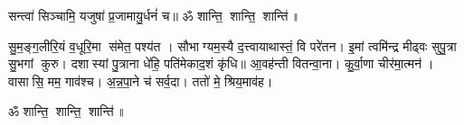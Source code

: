 
सन्त्वा॑ सिञ्चामि॒ यजुषा॑ प्र॒जामायु॒र्धनं॑ च॥ ॐ शान्ति॒ शान्ति॒ शान्ति॑॥

सु॒म॒ङ्ग॒लीरि॒यं व॒धूरि॒मा स॑मेत॒ पश्य॑त । सौभाग्यम॒स्यै द॒त्त्वायाथास्तं॒ वि परे॑तन। इ॒मां त्वमि॑न्द्र मीढ्वः सुपु॒त्रा सु॒भगां कुरु। दशास्यां पु॒त्राना धे॑हि॒ पति॑मेकाद॒शं कृ॑धि॥ आ॒वह॑न्ती वितन्वा॒ना। कु॒र्वा॒णा चीर॑मा॒त्मन॑। वासासि॒ मम॒ गाव॑श्च। अ॒न्न॒पा॒ने च॑ सर्व॒दा। ततो॑ मे॒ श्रिय॒माव॑ह।

ॐ शान्ति॒ शान्ति॒ शान्ति॑॥

\closesection